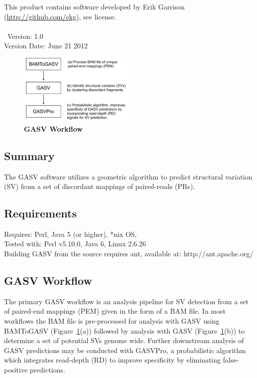\documentclass[11pt]{article}
\begin{document}
\noindent This product contains software developed by Erik Garrison (\url{http://github.com/ekg}), see license.\\ \\ 
\
\noindent Version: 1.0\\
\noindent Version Date: June 21 2012



\begin{figure}
  \begin{center}
    \includegraphics[width=0.5\textwidth]{Figures/GASV_Workflow.pdf}
  \end{center}
  \caption{\textbf{GASV Workflow}}
  \label{fig:GASVWorkflow}
\end{figure}


\subsection{Summary}

The GASV software utilizes a geometric algorithm to predict structural variation (SV) from a set of discordant mappings of paired-reads (PRs). 

\subsection{Requirements}
Requires: Perl, Java 5 (or higher), *nix OS, \\
\noindent Tested with: Perl v5.10.0, Java 6, Linux 2.6.26 \\

\noindent Building GASV from the source requires ant, available at: 
http://ant.apache.org/


\subsection{GASV Workflow}

The primary GASV workflow is an analysis pipeline for SV detection from a set of paired-end mappings (PEM) given in the form of a BAM file. In most workflows the BAM file is pre-processed for analysis with GASV using BAMToGASV (Figure~\ref{fig:GASVWorkflow}(a)) followed by analysis with GASV (Figure~\ref{fig:GASVWorkflow}(b)) to determine a set of potential SVs genome wide. Further downstream analysis of GASV predictions may be conducted with GASVPro, a probabilistic algorithm which integrates read-depth (RD) to improve specificity by eliminating false-positive predictions. 
\end{document}

